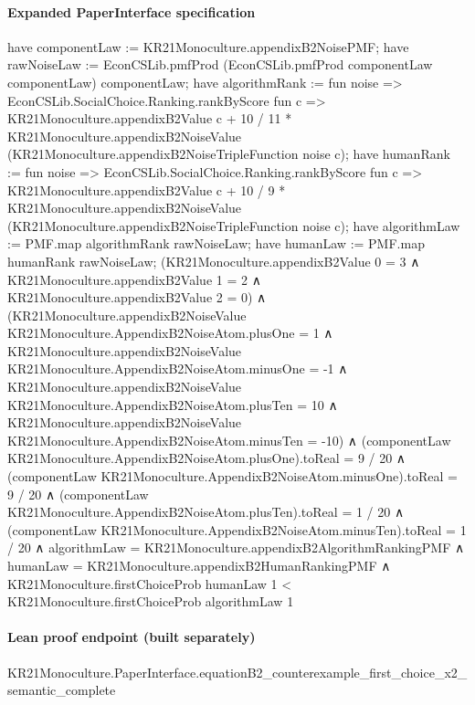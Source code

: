 \documentclass[10pt]{article}
\begin{document}
\paragraph{Expanded PaperInterface specification}
\begin{ReviewVerbatim}
have componentLaw := KR21Monoculture.appendixB2NoisePMF;
have rawNoiseLaw := EconCSLib.pmfProd (EconCSLib.pmfProd componentLaw componentLaw) componentLaw;
have algorithmRank := fun noise =>
  EconCSLib.SocialChoice.Ranking.rankByScore fun c =>
    KR21Monoculture.appendixB2Value c +
      10 / 11 * KR21Monoculture.appendixB2NoiseValue (KR21Monoculture.appendixB2NoiseTripleFunction noise c);
have humanRank := fun noise =>
  EconCSLib.SocialChoice.Ranking.rankByScore fun c =>
    KR21Monoculture.appendixB2Value c +
      10 / 9 * KR21Monoculture.appendixB2NoiseValue (KR21Monoculture.appendixB2NoiseTripleFunction noise c);
have algorithmLaw := PMF.map algorithmRank rawNoiseLaw;
have humanLaw := PMF.map humanRank rawNoiseLaw;
(KR21Monoculture.appendixB2Value 0 = 3 ∧
    KR21Monoculture.appendixB2Value 1 = 2 ∧ KR21Monoculture.appendixB2Value 2 = 0) ∧
  (KR21Monoculture.appendixB2NoiseValue KR21Monoculture.AppendixB2NoiseAtom.plusOne = 1 ∧
      KR21Monoculture.appendixB2NoiseValue KR21Monoculture.AppendixB2NoiseAtom.minusOne = -1 ∧
        KR21Monoculture.appendixB2NoiseValue KR21Monoculture.AppendixB2NoiseAtom.plusTen = 10 ∧
          KR21Monoculture.appendixB2NoiseValue KR21Monoculture.AppendixB2NoiseAtom.minusTen = -10) ∧
    (componentLaw KR21Monoculture.AppendixB2NoiseAtom.plusOne).toReal = 9 / 20 ∧
      (componentLaw KR21Monoculture.AppendixB2NoiseAtom.minusOne).toReal = 9 / 20 ∧
        (componentLaw KR21Monoculture.AppendixB2NoiseAtom.plusTen).toReal = 1 / 20 ∧
          (componentLaw KR21Monoculture.AppendixB2NoiseAtom.minusTen).toReal = 1 / 20 ∧
            algorithmLaw = KR21Monoculture.appendixB2AlgorithmRankingPMF ∧
              humanLaw = KR21Monoculture.appendixB2HumanRankingPMF ∧
                KR21Monoculture.firstChoiceProb humanLaw 1 < KR21Monoculture.firstChoiceProb algorithmLaw 1
\end{ReviewVerbatim}

\paragraph{Lean proof endpoint (built separately)}\begin{ReviewVerbatim}
KR21Monoculture.PaperInterface.equationB2_counterexample_first_choice_x2_semantic_complete
\end{ReviewVerbatim}
\end{document}
